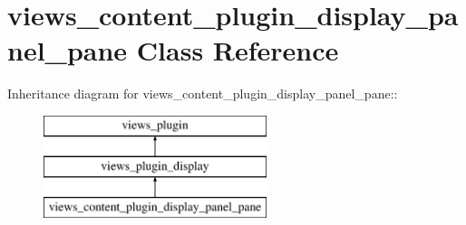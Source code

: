 \hypertarget{classviews__content__plugin__display__panel__pane}{
\section{views\_\-content\_\-plugin\_\-display\_\-panel\_\-pane Class Reference}
\label{classviews__content__plugin__display__panel__pane}
}
Inheritance diagram for views\_\-content\_\-plugin\_\-display\_\-panel\_\-pane::\begin{figure}[H]
\begin{center}
\leavevmode
\includegraphics[height=3cm]{classviews__content__plugin__display__panel__pane}
\end{center}
\end{figure}

